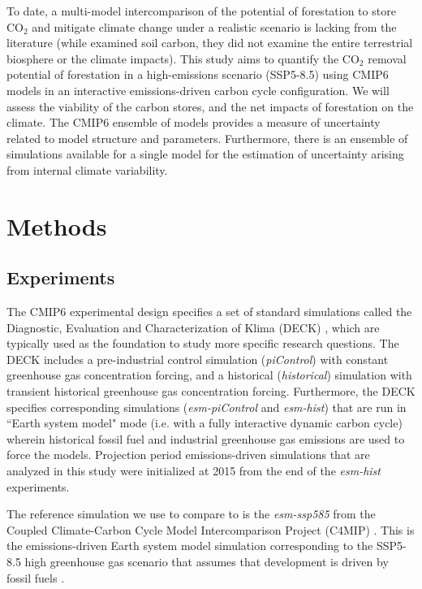 \documentclass[draft]{agujournal2019}
\begin{document}
To date, a multi-model intercomparison of the potential of forestation to store CO$_2$ and mitigate climate change under a realistic scenario is lacking from the literature (while  examined soil carbon, they did not examine the entire terrestrial biosphere or the climate impacts).
This study aims to quantify the CO$_2$ removal potential of forestation  in a high-emissions scenario (SSP5-8.5) using CMIP6 models in an interactive emissions-driven carbon cycle configuration.
We will assess the viability of the carbon stores, and the net impacts of forestation on the climate.
The CMIP6 ensemble of models provides a measure of uncertainty related to model structure and parameters.
Furthermore, there is an ensemble of simulations available for a single model for the estimation of uncertainty arising from internal climate variability. 

\section{Methods}

\subsection{Experiments}

The CMIP6 experimental design specifies a set of standard simulations called the Diagnostic, Evaluation and Characterization of Klima (DECK) \cite{eyring_overview_2016}, which are typically used as the foundation to study more specific research questions.
The DECK includes a pre-industrial control simulation (\textit{piControl}) with constant greenhouse gas concentration forcing, and a historical (\textit{historical}) simulation with transient historical greenhouse gas concentration forcing.
Furthermore, the DECK specifies corresponding simulations (\textit{esm-piControl} and \textit{esm-hist}) that are run in ``Earth system model" mode (i.e. with a fully interactive dynamic carbon cycle) wherein historical fossil fuel and industrial greenhouse gas emissions are used to force the models.
Projection period emissions-driven simulations that are analyzed in this study were initialized at 2015 from the end of the \textit{esm-hist} experiments.

The reference simulation we use to compare to  is the \textit{esm-ssp585} from the Coupled Climate-Carbon Cycle Model Intercomparison Project (C4MIP) \cite{jones_c4mip_2016}.
This is the emissions-driven Earth system model simulation corresponding to the SSP5-8.5 high greenhouse gas scenario that assumes that development is driven by fossil fuels \cite{oneill_scenario_2016}.
\end{document}
